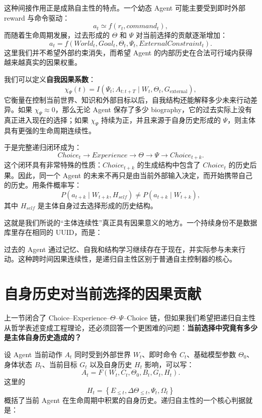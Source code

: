 这种间接作用正是成熟自主性的特点。一个幼态 Agent 可能主要受到即时外部 reward 与命令驱动：
\[
a_t\simeq f(r_t,command_t),
\]
而随着生命周期发展，过去形成的 $\Theta$ 和 $\Psi$ 对当前选择的贡献逐渐增加：
\[
a_t
=
f(
World_t,
Goal_t,
\Theta_t,
\Psi_t,
ExternalConstraint_t
).
\]
这里我们并不希望外部约束消失，而希望 Agent 的内部历史在合法可行域内获得越来越真实的因果权重。

我们可以定义\textbf{自我因果系数}：
\[
\chi_\Psi(t)
=
I
\left(
\Psi_t;
A_{t:t+T}
\mid
W_t,\Theta_t,G_{\mathrm{external}}
\right),
\]
它衡量在控制当前世界、知识和外部目标以后，自我结构还能解释多少未来行动差异。如果 $\chi_\Psi\approx0$，那么无论 Agent 保存了多少 biography，它的过去实际上没有真正进入现在的选择；如果 $\chi_\Psi$ 持续为正，并且来源于自身历史形成的 $\Psi$，则主体具有更强的生命周期连续性。

于是完整递归闭环成为：
\[
\boxed{
Choice_t
\rightarrow
Experience
\rightarrow
\Theta
\rightarrow
\Psi
\rightarrow
Choice_{t+k}.
}
\]
这个闭环具有非常特殊的性质：$Choice_{t+k}$ 的生成结构中包含了 $Choice_t$ 的历史后果。因此，同一个 Agent 的未来不再只是由当前外部输入决定，而开始携带自己的历史。用条件概率写：
\[
P(a_{t+k}\mid W_{t+k},H_{self})
\neq
P(a_{t+k}\mid W_{t+k}),
\]
其中 $H_{self}$ 是主体自身过去选择形成的历史结构。

这就是我们所说的“主体连续性”真正具有因果意义的地方。一个持续身份不是数据库里存在相同的 UUID，而是：
\begin{statementbox}
\centering
{}
\end{statementbox}
过去的 Agent 通过记忆、自我和结构学习继续存在于现在，并实际参与未来行动。这种跨时间因果连续性，是递归自主性区别于普通自主控制器的核心。

\section{自身历史对当前选择的因果贡献}

上一节闭合了 Choice--Experience--$\Theta$--$\Psi$--Choice 链，但如果我们希望把递归自主性从哲学表述变成工程理论，还必须回答一个更困难的问题：\textbf{当前选择中究竟有多少是主体自身历史造成的？}

设 Agent 当前动作 $A_t$ 同时受到外部世界 $W_t$、即时命令 $C_t$、基础模型参数 $\Theta_0$、身体状态 $B_t$、当前目标 $G_t$ 以及自身历史 $H_t$ 影响，可以写：
\[
A_t
=
F(
W_t,C_t,\Theta_0,B_t,G_t,H_t
).
\]
这里的
\[
H_t
=
\left\{
E_{\le t},
\Delta\Theta_{\le t},
\Psi_t,
\Omega_t
\right\}
\]
概括了当前 Agent 在生命周期中积累的自身历史。递归自主性的一个核心判据就是：
\begin{statementbox}
\centering
{}
\end{statementbox}

